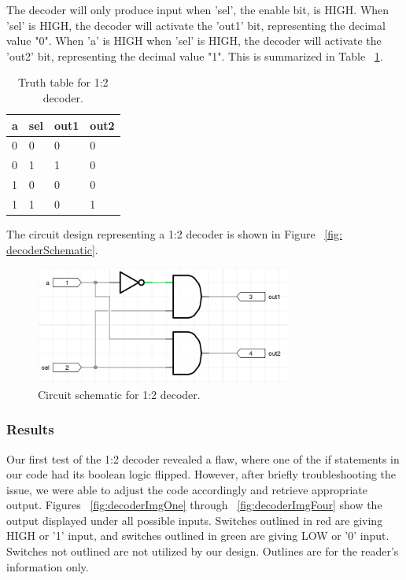 \documentclass[11pt]{article}
\begin{document}
The decoder will only produce input when 'sel', the enable bit, is HIGH. When 'sel' is HIGH, the decoder will activate the 'out1' bit, representing the decimal value "0". When 'a' is HIGH when 'sel' is HIGH, the decoder will activate the 'out2' bit, representing the decimal value "1". This is summarized in Table ~\ref{tab:decoderTruthTable}.

\begin{table}[h]
\begin{center}
	\begin{tabular}{| l | l | l | l |}
		\hline
		a & sel & out1 & out2 \\ \hline
		0 & 0 & 0 & 0 \\ \hline
		0 & 1 & 1 & 0 \\ \hline
		1 & 0 & 0 & 0 \\ \hline
		1 & 1 & 0 & 1 \\ \hline
	\end{tabular}
	\caption{\label{tab:decoderTruthTable} Truth table for 1:2 decoder.}
	\label{tab:decoderTruthTable}
\end{center}
\end{table}

The circuit design representing a 1:2 decoder is shown in Figure ~\ref{fig: decoderSchematic}.

\begin{figure}[H]
\begin{center}
	\includegraphics[width=0.75\textwidth]{report-images/img3.png}
	\caption{\label{fig: decoderSchematic} Circuit schematic for 1:2 decoder.}
	\label{fig:decoderSchematic}
\end{center}
\end{figure}

\subsubsection{Results}

Our first test of the 1:2 decoder revealed a flaw, where one of the if statements in our code had its boolean logic flipped. However, after briefly troubleshooting the issue, we were able to adjust the code accordingly and retrieve appropriate output. Figures ~\ref{fig:decoderImgOne} through ~\ref{fig:decoderImgFour} show the output displayed under all possible inputs. Switches outlined in red are giving HIGH or '1' input, and switches outlined in green are giving LOW or '0' input. Switches not outlined are not utilized by our design. Outlines are for the reader's information only.
\end{document}
